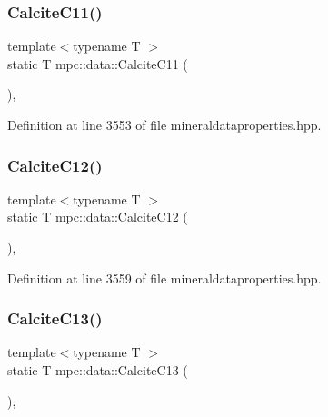 \subsubsection{\texorpdfstring{Calcite\+C11()}{CalciteC11()}}
{\footnotesize\ttfamily template$<$typename T $>$ \\
static T mpc\+::data\+::\+Calcite\+C11 (\begin{DoxyParamCaption}{ }\end{DoxyParamCaption})\hspace{0.3cm}{\ttfamily [inline]}, {\ttfamily [static]}}



Definition at line 3553 of file mineraldataproperties.\+hpp.

\mbox{\label{namespacempc_1_1data_a97de8f7514c9bad86546d5ce36b72a16}} 
\subsubsection{\texorpdfstring{Calcite\+C12()}{CalciteC12()}}
{\footnotesize\ttfamily template$<$typename T $>$ \\
static T mpc\+::data\+::\+Calcite\+C12 (\begin{DoxyParamCaption}{ }\end{DoxyParamCaption})\hspace{0.3cm}{\ttfamily [inline]}, {\ttfamily [static]}}



Definition at line 3559 of file mineraldataproperties.\+hpp.

\mbox{\label{namespacempc_1_1data_a13c90af5b73d7f9882e12b757a599e73}} 
\subsubsection{\texorpdfstring{Calcite\+C13()}{CalciteC13()}}
{\footnotesize\ttfamily template$<$typename T $>$ \\
static T mpc\+::data\+::\+Calcite\+C13 (\begin{DoxyParamCaption}{ }\end{DoxyParamCaption})\hspace{0.3cm}{\ttfamily [inline]}, {\ttfamily [static]}}



